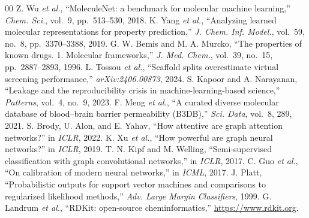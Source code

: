 \documentclass[conference]{IEEEtran}
\begin{document}
\begin{thebibliography}{00}
 Z. Wu \emph{et al.}, ``MoleculeNet: a benchmark for molecular
machine learning,'' \emph{Chem. Sci.}, vol.~9, pp.~513--530, 2018.
 K. Yang \emph{et al.}, ``Analyzing learned molecular
representations for property prediction,'' \emph{J. Chem. Inf. Model.}, vol.~59,
no.~8, pp.~3370--3388, 2019.
 G. W. Bemis and M. A. Murcko, ``The properties of known drugs.
1. Molecular frameworks,'' \emph{J. Med. Chem.}, vol.~39, no.~15, pp.~2887--2893,
1996.
 L. Tossou \emph{et al.}, ``Scaffold splits overestimate
virtual screening performance,'' \emph{arXiv:2406.00873}, 2024.
 S. Kapoor and A. Narayanan, ``Leakage and the reproducibility
crisis in machine-learning-based science,'' \emph{Patterns}, vol.~4, no.~9, 2023.
 F. Meng \emph{et al.}, ``A curated diverse molecular database of
blood--brain barrier permeability (B3DB),'' \emph{Sci. Data}, vol.~8, 289, 2021.
 S. Brody, U. Alon, and E. Yahav, ``How attentive are graph
attention networks?'' in \emph{ICLR}, 2022.
 K. Xu \emph{et al.}, ``How powerful are graph neural networks?''
in \emph{ICLR}, 2019.
 T. N. Kipf and M. Welling, ``Semi-supervised classification with
graph convolutional networks,'' in \emph{ICLR}, 2017.
 C. Guo \emph{et al.}, ``On calibration of modern neural
networks,'' in \emph{ICML}, 2017.
 J. Platt, ``Probabilistic outputs for support vector machines
and comparisons to regularized likelihood methods,'' \emph{Adv. Large Margin
Classifiers}, 1999.
 G. Landrum \emph{et al.}, ``RDKit: open-source cheminformatics,''
\url{https://www.rdkit.org}.
\end{thebibliography}
\end{document}
